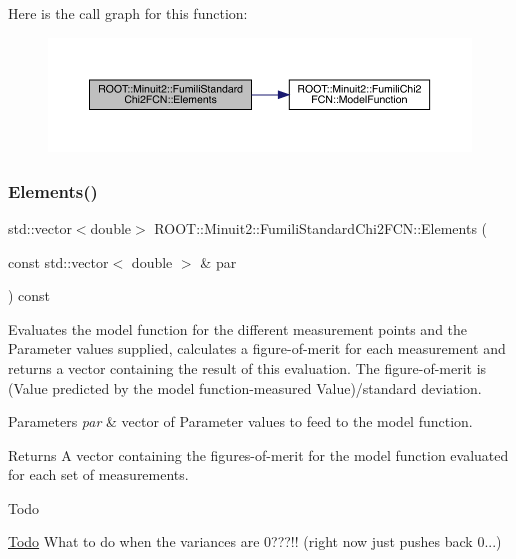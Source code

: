 Here is the call graph for this function\+:
\nopagebreak
\begin{figure}[H]
\begin{center}
\leavevmode
\includegraphics[width=350pt]{d8/db2/classROOT_1_1Minuit2_1_1FumiliStandardChi2FCN_ae7683cdbfa4160902add963d2132ab76_cgraph}
\end{center}
\end{figure}
\mbox{\label{classROOT_1_1Minuit2_1_1FumiliStandardChi2FCN_ab05d3fe2dcb9b1c56b6753debe5e0064}} 
\subsubsection{\texorpdfstring{Elements()}{Elements()}\hspace{0.1cm}{\footnotesize\ttfamily [2/3]}}
{\footnotesize\ttfamily std\+::vector$<$double$>$ R\+O\+O\+T\+::\+Minuit2\+::\+Fumili\+Standard\+Chi2\+F\+C\+N\+::\+Elements (\begin{DoxyParamCaption}\item[{const std\+::vector$<$ double $>$ \&}]{par }\end{DoxyParamCaption}) const\hspace{0.3cm}{\ttfamily [virtual]}}

Evaluates the model function for the different measurement points and the Parameter values supplied, calculates a figure-\/of-\/merit for each measurement and returns a vector containing the result of this evaluation. The figure-\/of-\/merit is (Value predicted by the model function-\/measured Value)/standard deviation.


\begin{DoxyParams}{Parameters}
{\em par} & vector of Parameter values to feed to the model function.\\
\hline
\end{DoxyParams}
\begin{DoxyReturn}{Returns}
A vector containing the figures-\/of-\/merit for the model function evaluated for each set of measurements.
\end{DoxyReturn}
\begin{DoxyRefDesc}{Todo}
\item[\mbox{\hyperlink{todo__todo000022}{Todo}}]What to do when the variances are 0???!! (right now just pushes back 0...)\end{DoxyRefDesc}


